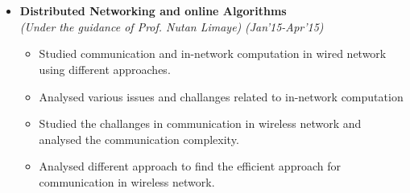 \\[-.7cm]\\
\begin{itemize}
\item \textbf{Distributed Networking and online Algorithms}  \\
      \emph{(Under the guidance of Prof. Nutan Limaye)} \hfill {\emph{(Jan'15-Apr'15)}} \\[-0.5cm]
      \begin{itemize}
	    \item Studied communication and in-network computation in wired network using different approaches.\\[-0.4cm]
	    \item Analysed various issues and challanges related to in-network computation\\[-0.4cm]
	    \item Studied the challanges in communication in wireless network and analysed the communication complexity.\\[-0.4cm]
	    \item Analysed different approach to find the efficient approach for communication in wireless network.\\[-0.4cm]
      \end{itemize}
\end{itemize}

